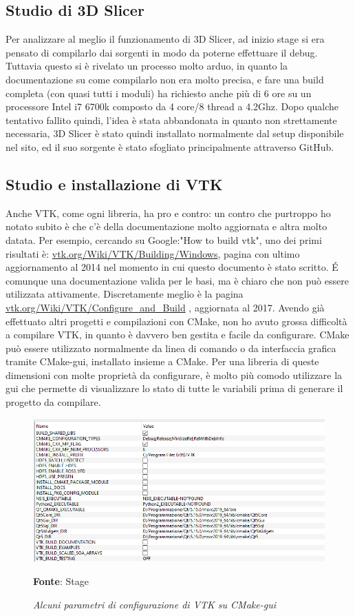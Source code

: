 \subsection{Studio di 3D Slicer}
Per analizzare al meglio il funzionamento di 3D Slicer, ad inizio stage si era pensato di compilarlo dai sorgenti in modo da poterne effettuare il debug. Tuttavia questo si è rivelato un processo molto arduo, in quanto la documentazione su come compilarlo non era molto precisa, e fare una build completa (con quasi tutti i moduli) ha richiesto anche più di 6 ore su un processore Intel i7 6700k composto da 4 core/8 thread a 4.2Ghz. Dopo qualche tentativo fallito quindi, l'idea è stata abbandonata in quanto non strettamente necessaria, 3D Slicer è stato quindi installato normalmente dal setup disponibile nel sito, ed il suo sorgente è stato sfogliato principalmente attraverso GitHub.

\subsection{Studio e installazione di VTK}
Anche VTK, come ogni libreria, ha pro e contro: un contro che purtroppo ho notato subito è che c'è della documentazione molto aggiornata e altra molto datata. Per esempio, cercando su Google:"How to build vtk", uno dei primi risultati è: \href{https://vtk.org/Wiki/VTK/Building/Windows}{vtk.org/Wiki/VTK/Building/Windows}, pagina con ultimo aggiornamento al 2014 nel momento in cui questo documento è stato scritto. \'E comunque una documentazione valida per le basi, ma è chiaro che non può essere utilizzata attivamente. Discretamente meglio è la pagina \href{https://vtk.org/Wiki/VTK/Configure_and_Build}{vtk.org/Wiki/VTK/Configure\_and\_Build} , aggiornata al 2017. Avendo già effettuato altri progetti e compilazioni con CMake, non ho avuto grossa difficoltà a compilare VTK, in quanto è davvero ben gestita e facile da configurare. CMake può essere utilizzato normalmente da linea di comando o da interfaccia grafica tramite CMake-gui, installato insieme a CMake. Per una libreria di queste dimensioni con molte proprietà da configurare, è molto più comodo utilizzare la gui che permette di visualizzare lo stato di tutte le variabili prima di generare il progetto da compilare.

\begin{figure}[h]
    \centering
    \includegraphics[width=1\textwidth]{immagini/svolgimento/vtkcmake.png}
    \caption{\textit{Alcuni parametri di configurazione di VTK su CMake-gui}}
    \textbf{Fonte}: Stage
    \label{fig: VTK CMAKE}
\end{figure}

